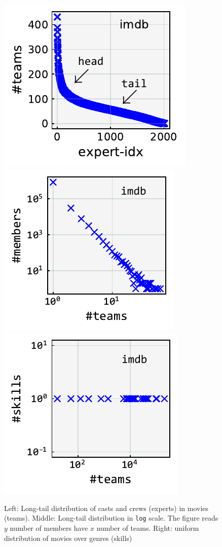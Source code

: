 \documentclass[runningheads]{llncs}
\begin{document}
\begin{figure}[t]
\centering
\includegraphics[scale=0.65]{figures/nteams_candidate-idx.pdf}
\includegraphics[scale=0.65]{figures/nmembers_nteams.pdf}
\includegraphics[scale=0.65]{figures/nskills_nteams.pdf}
\vspace{-1em}
\caption{Left: Long-tail distribution of casts and crews (experts) in movies (teams). Middle: Long-tail distribution in \texttt{log} scale. The figure reads $y$ number of members have $x$ number of teams. Right: uniform distribution of movies over genres (skills)} \label{fig:dist}
\vspace{-1em}
\end{figure}
\end{document}
